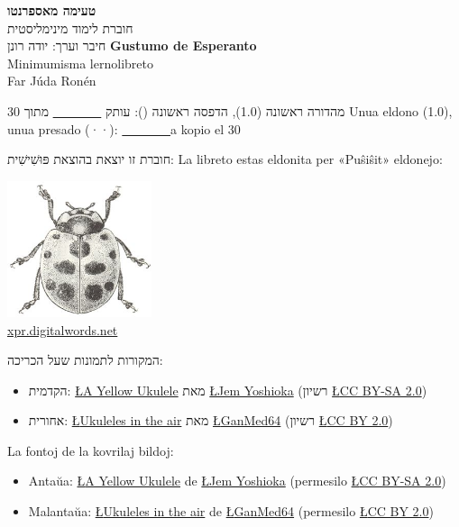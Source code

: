\dulingvaujo
{
	\textbf{טעימה מאספרנטו}\\
	חוברת לימוד מינימליסטית\\[1ex]
	חיבר וערך: יודה רונן
}
{
	\textbf{Gustumo de Esperanto}\\
	Minimumisma lernolibreto\\[1ex]
	Far Júda Ronén
}

\apartigilo

\dulingvaujo
{
	מהדורה ראשונה (1.0), הדפסה ראשונה (): עותק \underline{~ ~ ~ ~ ~} מתוך 30
}
{
	Unua eldono (1.0), unua presado (\the\year·\the\month·\the\day): \underline{~ ~ ~ ~ ~}a kopio el 30
}

\apartigilo

\dulingvaujo
{
	חוברת זו יוצאת בהוצאת פּוּשִׁישִׁית:
}
{
	La libreto estas eldonita per «Puŝiŝit» eldonejo:
}

\begin{center}
	\includegraphics[height=4cm]{"puŝiŝit.png"}\\
	\url{xpr.digitalwords.net}
\end{center}

\apartigilo

\dulingvaujo
{
המקורות לתמונות שעל הכריכה:
\begin{itemize}
	\item הקדמית: \href{https://www.flickr.com/photos/jemshed/6423813619/}{\L{A Yellow Ukulele}} מאת \href{https://www.flickr.com/photos/jemshed/}{\L{Jem Yoshioka}} (רשיון \href{https://creativecommons.org/licenses/by-sa/2.0/}{\L{CC BY-SA 2.0}})
	\item אחורית: \href{https://www.flickr.com/photos/ganmed64/3645911185/}{\L{Ukuleles in the air}} מאת \href{https://www.flickr.com/photos/ganmed64/}{\L{GanMed64}} (רשיון \href{https://creativecommons.org/licenses/by/2.0/}{\L{CC BY 2.0}})
\end{itemize}
}
{
La fontoj de la kovrilaj bildoj:
\begin{itemize}
	\item Antaŭa: \href{https://www.flickr.com/photos/jemshed/6423813619/}{\L{A Yellow Ukulele}} de \href{https://www.flickr.com/photos/jemshed/}{\L{Jem Yoshioka}} (permesilo \href{https://creativecommons.org/licenses/by-sa/2.0/}{\L{CC BY-SA 2.0}})
	\item Malantaŭa: \href{https://www.flickr.com/photos/ganmed64/3645911185/}{\L{Ukuleles in the air}} de \href{https://www.flickr.com/photos/ganmed64/}{\L{GanMed64}} (permesilo \href{https://creativecommons.org/licenses/by/2.0/}{\L{CC BY 2.0}})
\end{itemize}
}
